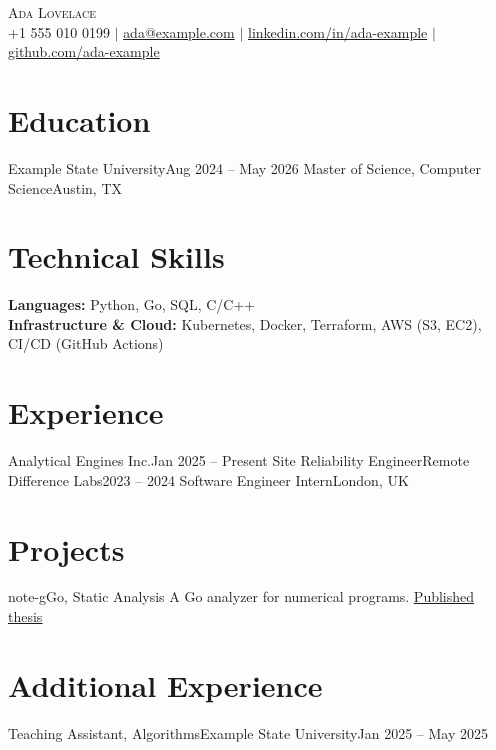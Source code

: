 \documentclass[letterpaper,11pt]{article}
\begin{document}
\begin{center}
    {\Huge \scshape Ada Lovelace} \\ \vspace{1pt}
    \small +1 555 010 0199 $|$
    \href{mailto:ada@example.com}{ada@example.com} $|$
    \href{https://linkedin.com/in/ada-example}{linkedin.com/in/ada-example} $|$
    \href{https://github.com/ada-example}{github.com/ada-example}
\end{center}

\section{Education}
\resumeSubHeadingListStart
\resumeSubheading
{Example State University}{Aug 2024 -- May 2026}
{Master of Science, Computer Science}{Austin, TX}
\resumeSubHeadingListEnd

\section{Technical Skills}
\begin{itemize}[leftmargin=0.15in,label={}]
\small{\item{
\textbf{Languages:} Python, Go, SQL, C/C++ \\
\textbf{Infrastructure \& Cloud:} Kubernetes, Docker, Terraform, AWS (S3, EC2), CI/CD (GitHub Actions)
}}
\end{itemize}

\section{Experience}
\resumeSubHeadingListStart
\resumeSubheading
{Analytical Engines Inc.}{Jan 2025 -- Present}
{Site Reliability Engineer}{Remote}
\resumeItemListStart
{}
\resumeItemListEnd
\resumeSubheading
{Difference Labs}{2023 -- 2024}
{Software Engineer Intern}{London, UK}
\resumeItemListStart
{}
\resumeItemListEnd
\resumeSubHeadingListEnd

\section{Projects}
\resumeSubHeadingListStart
\resumeProject
{note-g}{Go, Static Analysis}
{A Go analyzer for numerical programs. \href{https://example.com/thesis}{\underline{Published thesis}}}
\resumeSubHeadingListEnd

\section{Additional Experience}
\resumeSubHeadingListStart
\resumeCompact
{Teaching Assistant, Algorithms}{Example State University}{Jan 2025 -- May 2025}
\resumeSubHeadingListEnd
\end{document}

